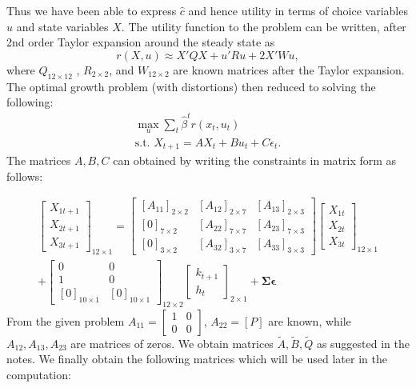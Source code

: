 \documentclass[12pt]{article}
\begin{document}
Thus we have been able to express $\hat{c}$ and hence utility in terms of choice variables $u$ and state variables $X$. The utility function to the problem can be written, after 2nd order Taylor expansion around the steady state as $$r(X, u) \approx  X'QX + u'Ru + 2X'Wu,$$ where $Q_{12 \times 12}$ , $R_{2 \times 2}$, and $W_{12 \times 2}$ are known matrices after the Taylor expansion. The optimal growth problem (with distortions) then reduced to solving the following: \begin{align*}
	\max_{u} \sum_t \hat\beta^t r(x_t, u_t) \\
	 \text{s.t. } X_{t+1} = A X_t + B u_t + C \epsilon_t .
\end{align*} The matrices $A, B, C$ can obtained by writing the constraints  in matrix form as follows:

\begin{multline*}
\begin{bmatrix} X_{1t+1} \\ X_{2t+1} \\ X_{3t+1} \end{bmatrix}_{12 \times 1} 
= \begin{bmatrix} [A_{11}]_{2 \times 2} & [A_{12}]_{2 \times 7} & [A_{13}]_{2 \times 3} \\
                  [0]_{7 \times 2} & [A_{22}]_{7 \times 7} & [A_{23}]_{7 \times 3} \\
                  [0]_{3 \times 2} & [A_{32}]_{3 \times 7} & [A_{33}]_{3 \times 3} \end{bmatrix} \begin{bmatrix} X_{1t} \\ X_{2t} \\ X_{3t} \end{bmatrix}_{12 \times 1} \\                  
                  + \begin{bmatrix} 0 & 0 \\ 1 & 0 \\ [0]_{10 \times 1} & [0]_{10 \times 1}\end{bmatrix}_{12 \times 2}
 \begin{bmatrix} k_{t+1} \\ h_t \end{bmatrix}_{2 \times 1}   + \mathbf{\Sigma \epsilon}
\end{multline*}
From the given problem $A_{11} = \begin{bmatrix} 1 & 0 \\ 0 & 0 \end{bmatrix}$, $A_{22} = [P]$ are known, while $A_{12}, A_{13}, A_{23}$ are matrices of zeros. We obtain matrices $\tilde{A}, \tilde{B}, \tilde{Q}$ as suggested in the notes. We finally obtain the following matrices which will be used later in the computation: 
\end{document}
